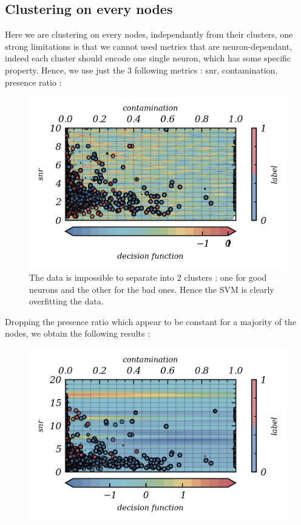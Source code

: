 \documentclass[11pt,a4paper]{report}
\begin{document}
\begin{multicols}{2}
    \subsection{Clustering on every nodes}
    Here we are clustering on every nodes, independantly from their clusters, one strong limitations is that we cannot used metrics that are neuron-dependant, indeed each cluster should encode one single neuron, which has some
    specific property. Hence, we use just the 3 following metrics : snr, contamination, presence ratio :
    \begin{figure}[H]
        \centering
        \includegraphics[width=0.9\linewidth]{figure/decision_function_working_2.png}
        \caption{The data is impossible to separate into 2 clusters : one for good neurons and the other for the bad ones. Hence the SVM is clearly overfitting the data.}
        \label{}
    \end{figure}
    Dropping the presence ratio which appear to be constant for a majority of the nodes, we obtain the following results :
    \begin{figure}[H]
        \centering
        \includegraphics[width=0.9\linewidth]{figure/decision_function_working_3.png}

\end{figure}
\end{multicols}
\end{document}
